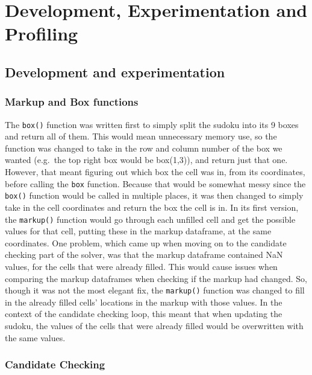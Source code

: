 \documentclass[12pt]{report} %
\begin{document}
\chapter{Development, Experimentation and Profiling}

\section{Development and experimentation}

\subsection{Markup and Box functions}


The \texttt{box()} function was written first to simply split the sudoku into its 9 boxes and return all of them. This would mean unnecessary memory use, so the function was changed to take in the row and column number of the box we wanted (e.g.\ the top right box would be box(1,3)), and return just that one. However, that meant figuring out which box the cell was in, from its coordinates, before calling the \texttt{box} function. Because that would be somewhat messy since the \texttt{box()} function would be called in multiple places, it was then changed to simply take in the cell coordinates and return the box the cell is in.
In its first version, the \texttt{markup()} function would go through each unfilled cell and get the possible values for that cell, putting these in the markup dataframe, at the same coordinates. One problem, which came up when moving on to the candidate checking part of the solver, was that the markup dataframe contained NaN values, for the cells that were already filled. This would cause issues when comparing the markup dataframes when checking if the markup had changed. So, though it was not the most elegant fix, the \texttt{markup()} function was changed to fill in the already filled cells' locations in the markup with those values. In the context of the candidate checking loop, this meant that when updating the sudoku, the values of the cells that were already filled would be overwritten with the same values.

\subsection{Candidate Checking}
\end{document}
